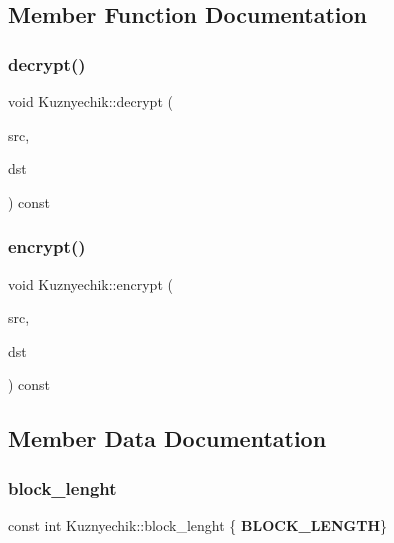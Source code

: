 \subsection{Member Function Documentation}
\mbox{\label{class_kuznyechik_a8f699d0a38e8fa9c147d7b31d759bf26}} 
\subsubsection{decrypt()}
{\footnotesize\ttfamily void Kuznyechik\+::decrypt (\begin{DoxyParamCaption}\item[{const \textbf{ Byte\+Block} \&}]{src,  }\item[{\textbf{ Byte\+Block} \&}]{dst }\end{DoxyParamCaption}) const}

\mbox{\label{class_kuznyechik_ace290770ef015f19d6c0e06c66a4f29d}} 
\subsubsection{encrypt()}
{\footnotesize\ttfamily void Kuznyechik\+::encrypt (\begin{DoxyParamCaption}\item[{const \textbf{ Byte\+Block} \&}]{src,  }\item[{\textbf{ Byte\+Block} \&}]{dst }\end{DoxyParamCaption}) const}



\subsection{Member Data Documentation}
\mbox{\label{class_kuznyechik_acf61a43f8d6c726b0d334df98bdc0337}} 
\subsubsection{block\+\_\+lenght}
{\footnotesize\ttfamily const int Kuznyechik\+::block\+\_\+lenght \{\textbf{ B\+L\+O\+C\+K\+\_\+\+L\+E\+N\+G\+TH}\}\hspace{0.3cm}{\ttfamily [static]}}

\mbox{\label{class_kuznyechik_ad174f2e619e033cc9f29a265825aba41}} 
